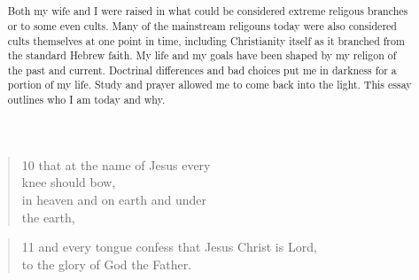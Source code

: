 \documentclass[11pt,a4paper]{scrartcl} %
\begin{document}
\begin{verse}
10 that at the name of Jesus every\\ knee should bow,\\ in heaven and on earth and under\\ the earth,
\end{verse}
\begin{verse}
11 and every tongue confess that Jesus Christ is Lord,\\ to the glory of God the Father.
\end{verse} 
\clearpage
\title{\textcolor{Maroon}{\rmfamily\normalfont{}}}
    \author{\textcolor{brown}{}}
    \date{} %
    
    \maketitle
    
    \begin{abstract}
Both my wife and I were raised in what could be considered extreme religous branches or to some even cults. Many of the mainstream religouns today were also considered cults themselves at one point in time, including Christianity itself as it branched from the standard Hebrew faith. My life and my goals have been shaped by my religon of the past and current. Doctrinal differences and bad choices put me in darkness for a portion of my life. Study and prayer allowed me to come back into the light. This essay outlines who I am today and why.
    \end{abstract}
       
    \tableofcontents
\end{document}
